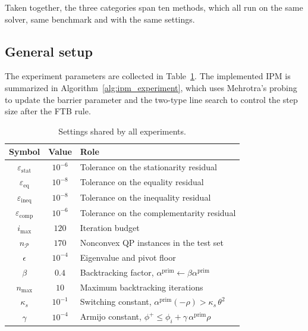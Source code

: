 \documentclass[class=scrbook, crop=false]{standalone}
\begin{document}
Taken together, the three categories span ten methods, which all run on the same solver, same benchmark and with the same settings.

\subsection{General setup}
\label{subsec:general_setup}
The experiment parameters are collected in Table~\ref{tab:general_settings}.
The implemented \gls{IPM} is summarized in Algorithm~\ref{alg:ipm_experiment},
which uses Mehrotra's probing to update the barrier parameter
and the two-type line search to control the step size after the \gls{FTB} rule.

\begin{table}[htbp]
\centering
\caption{Settings shared by all experiments.}
\label{tab:general_settings}
\vspace{0.5em}
\begin{tabular}{ccp{8.5cm}}
    \toprule
    \textbf{Symbol} & \textbf{Value} & \textbf{Role} \\
    \midrule
    $\varepsilon_\mathrm{stat}$ & $10^{-6}$ & Tolerance on the stationarity residual \\
    $\varepsilon_\mathrm{eq}$   & $10^{-8}$ & Tolerance on the equality residual \\
    $\varepsilon_\mathrm{ineq}$ & $10^{-8}$ & Tolerance on the inequality residual \\
    $\varepsilon_\mathrm{comp}$ & $10^{-6}$ & Tolerance on the complementarity residual \\
    $i_\mathrm{max}$   & $120$     & Iteration budget \\
    $n_\mathcal{P}$    & $170$     & Nonconvex \gls{QP} instances in the test set \\
    $\epsilon$         & $10^{-4}$ & Eigenvalue and pivot floor \\
    $\beta$           & $0.4$      & Backtracking factor, $\alpha^\mathrm{prim} \leftarrow \beta\alpha^\mathrm{prim}$ \\
    $n_\mathrm{max}$        & $10$        & Maximum backtracking iterations \\
    $\kappa_s$      & $10^{-1}$  & Switching constant, $\alpha^\mathrm{prim}(-\rho) > \kappa_s\,\theta^2$ \\
    $\gamma$        & $10^{-4}$  & Armijo constant, $\phi^+ \le \phi_i + \gamma\,\alpha^\mathrm{prim}\rho$ \\
    \bottomrule
\end{tabular}
\end{table}
\end{document}
